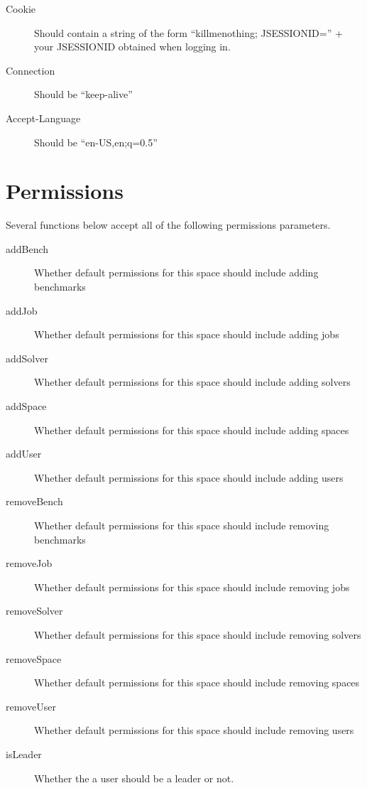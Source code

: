 \begin{description}
\item [Cookie]  Should contain a string of the form ``killmenothing; JSESSIONID='' + your JSESSIONID obtained when logging in.
\item [Connection]  Should be ``keep-alive''
\item [Accept-Language]  Should be ``en-US,en;q=0.5''
\end{description}

\section{Permissions}

Several functions below accept all of the following permissions parameters.

\begin{description}
\item [addBench]  Whether default permissions for this space should include adding benchmarks
\item [addJob]  Whether default permissions for this space should include adding jobs
\item [addSolver]  Whether default permissions for this space should include adding solvers
\item [addSpace]  Whether default permissions for this space should include adding spaces
\item [addUser]  Whether default permissions for this space should include adding users
\item [removeBench]  Whether default permissions for this space should include removing benchmarks
\item [removeJob]  Whether default permissions for this space should include removing jobs
\item [removeSolver]  Whether default permissions for this space should include removing solvers
\item [removeSpace]  Whether default permissions for this space should include removing spaces
\item [removeUser]  Whether default permissions for this space should include removing users
\item [isLeader]  Whether the a user should be a leader or not.
\end{description}
